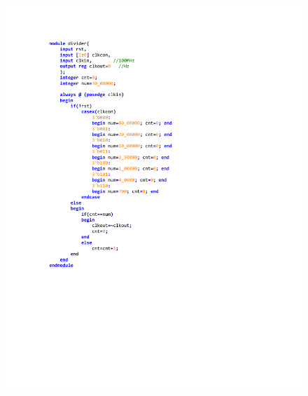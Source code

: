 \documentclass[titlepage, 11pt]{article}
\begin{document}
		\begin{figure}[H] 
			\begin{minipage}[H]{0.5\linewidth}  
			\centerfirst
			\includegraphics[scale=1]{13.pdf}  
			\caption*{}  
			\end{minipage}
			\begin{minipage}[H]{0.5\linewidth}  
			\centerfirst

\end{minipage}
\end{figure}
\end{document}
